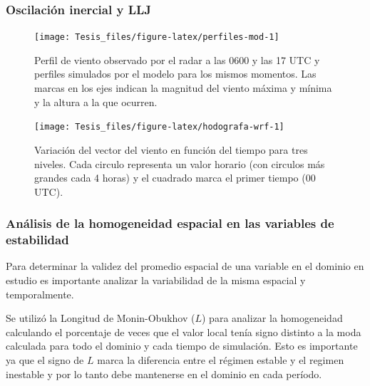 \documentclass[12pt,spanish,oneside]{book}
\begin{document}
\subsubsection{Oscilación inercial y
LLJ}\label{oscilacion-inercial-y-llj-1}

\begin{figure}

{\centering \texttt{[image: Tesis\_files/figure-latex/perfiles-mod-1]} 

}

\caption{Perfil de viento observado por el radar a las 0600 y las 17 UTC y perfiles simulados por el modelo para los mismos momentos. Las marcas en los ejes indican la magnitud del viento máxima y mínima y la altura a la que ocurren. \label{perfiles-modelo}}\label{fig:perfiles-mod}
\end{figure}

\begin{figure}

{\centering \texttt{[image: Tesis\_files/figure-latex/hodografa-wrf-1]} 

}

\caption{Variación del vector del viento en función del tiempo para tres niveles. Cada circulo representa un valor horario (con circulos más grandes cada 4 horas) y el cuadrado marca el primer tiempo (00 UTC). \label{hodografa-wrf}}\label{fig:hodografa-wrf}
\end{figure}

\subsubsection{Análisis de la homogeneidad espacial en las variables de
estabilidad}\label{analisis-de-la-homogeneidad-espacial-en-las-variables-de-estabilidad}

Para determinar la validez del promedio espacial de una variable en el
dominio en estudio es importante analizar la variabilidad de la misma
espacial y temporalmente.

Se utilizó la Longitud de Monin-Obukhov (\(L\)) para analizar la
homogeneidad calculando el porcentaje de veces que el valor local tenía
signo distinto a la moda calculada para todo el dominio y cada tiempo de
simulación. Esto es importante ya que el signo de \(L\) marca la
diferencia entre el régimen estable y el regimen inestable y por lo
tanto debe mantenerse en el dominio en cada período.
\end{document}
